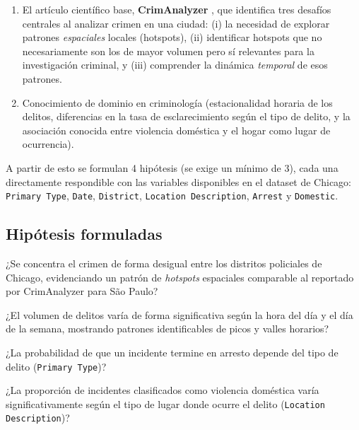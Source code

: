 \documentclass[11pt,a4paper]{article}
\begin{document}
\begin{enumerate}
    \item El artículo científico base, \textbf{CrimAnalyzer}
    \cite{crimanalyzer}, que identifica tres desafíos centrales al analizar
    crimen en una ciudad: (i) la necesidad de explorar patrones
    \emph{espaciales} locales (hotspots), (ii) identificar hotspots que no
    necesariamente son los de mayor volumen pero sí relevantes para la
    investigación criminal, y (iii) comprender la dinámica \emph{temporal}
    de esos patrones.
    \item Conocimiento de dominio en criminología (estacionalidad horaria de
    los delitos, diferencias en la tasa de esclarecimiento según el tipo de
    delito, y la asociación conocida entre violencia doméstica y el hogar
    como lugar de ocurrencia).
\end{enumerate}

A partir de esto se formulan 4 hipótesis (se exige un mínimo de 3), cada una
directamente respondible con las variables disponibles en el dataset de
Chicago: \texttt{Primary Type}, \texttt{Date}, \texttt{District},
\texttt{Location Description}, \texttt{Arrest} y \texttt{Domestic}.

\subsection{Hipótesis formuladas}

\begin{description}[leftmargin=1.6cm, style=nextline]
    \item[Hipótesis 1 (espacial):] ¿Se concentra el crimen de forma desigual
    entre los distritos policiales de Chicago, evidenciando un patrón de
    \emph{hotspots} espaciales comparable al reportado por CrimAnalyzer para
    São Paulo?

    \item[Hipótesis 2 (temporal):] ¿El volumen de delitos varía de forma
    significativa según la hora del día y el día de la semana, mostrando
    patrones identificables de picos y valles horarios?

    \item[Hipótesis 3 (esclarecimiento):] ¿La probabilidad de que un
    incidente termine en arresto depende del tipo de delito
    (\texttt{Primary Type})?

    \item[Hipótesis 4 (violencia doméstica y lugar):] ¿La proporción de
    incidentes clasificados como violencia doméstica varía significativamente
    según el tipo de lugar donde ocurre el delito
    (\texttt{Location Description})?
\end{description}
\end{document}

